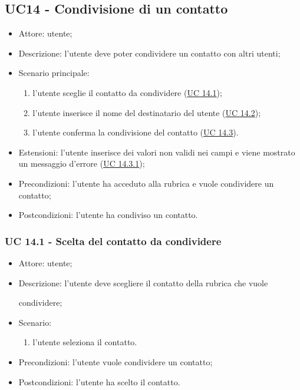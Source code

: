 \subsection{UC14 - Condivisione di un contatto}
\begin{itemize}
    \item Attore: utente;
    \item Descrizione: l'utente deve poter condividere un contatto con altri utenti;
    \item Scenario principale:
        \begin{enumerate}
        \item l'utente sceglie il contatto da condividere (\hyperref[sec: UC 14.1]{UC 14.1});
        \item l'utente inserisce il nome del destinatario del utente (\hyperref[sec: UC 14.2]{UC 14.2});
        \item l'utente conferma la condivisione del contatto (\hyperref[sec: UC 14.3]{UC 14.3}).
        \end{enumerate}
    \item Estensioni: l'utente inserisce dei valori non validi nei campi e viene mostrato un messaggio d'errore (\hyperref[sec: UC14.3.1]{UC 14.3.1});
    \item Precondizioni: l'utente ha acceduto alla rubrica e vuole condividere un contatto;
    \item Postcondizioni: l'utente ha condiviso un contatto.
\end{itemize}

\subsubsection{UC 14.1 - Scelta del contatto da condividere} \label{sec: UC 14.1}
\begin{itemize}
    \item Attore: utente;
    \item Descrizione: l'utente deve scegliere il contatto della rubrica che vuole \par condividere;
    \item Scenario:
        \begin{enumerate}
        \item l'utente seleziona il contatto.
        \end{enumerate}
    
    \item Precondizioni: l'utente vuole condividere un contatto;
    \item Postcondizioni: l'utente ha scelto il contatto.
\end{itemize}


